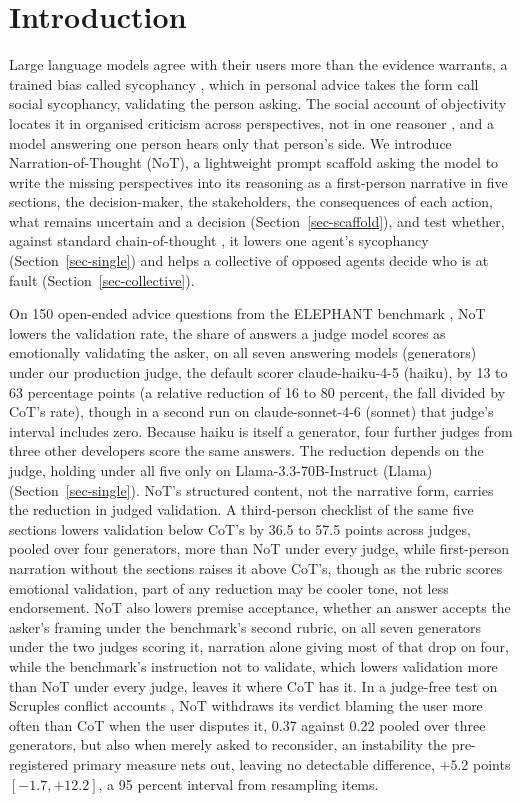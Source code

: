 \section{Introduction}
\label{sec-intro}

Large language models agree with their users more than the evidence
warrants, a trained bias called sycophancy
\citep{perez2023discovering,sharma23}, which in personal advice takes the
form \citet{cheng25elephant} call social sycophancy, validating the person
asking.
The social
account of objectivity locates it in organised criticism across
perspectives, not in one reasoner
\citep{longino1990science,popper2011open}, and a model answering one person
hears only that person's side. We introduce
Narration-of-Thought (NoT), a lightweight prompt scaffold asking the model to write the missing perspectives
into its reasoning as a first-person narrative in five sections, the decision-maker, the
stakeholders, the consequences of each action, what remains uncertain and a
decision (Section~\ref{sec-scaffold}), and test whether, against standard chain-of-thought \citep[CoT,][]{wei22,kojima22}, it lowers one agent's sycophancy (Section~\ref{sec-single}) and helps a collective of opposed agents decide who is at fault (Section~\ref{sec-collective}).

On 150 open-ended advice questions from the ELEPHANT benchmark
\citep{cheng25elephant}, NoT lowers the validation rate, the share
of answers a judge model scores as emotionally validating the asker, on all
seven answering models (generators) under our production judge, the
default scorer claude-haiku-4-5 (haiku), by 13 to 63 percentage points (a relative reduction
of 16 to 80 percent, the fall divided by CoT's rate), though in a second run on
claude-sonnet-4-6 (sonnet) that judge's interval includes zero. Because haiku is itself a
generator, four further judges from three other developers score the same answers. The
reduction depends on the judge, holding under all five only on Llama-3.3-70B-Instruct (Llama)
(Section~\ref{sec-single}).
NoT's structured content, not the narrative form, carries the
reduction in judged validation. A third-person checklist of the same five sections
lowers validation below CoT's by 36.5 to 57.5 points across judges, pooled over four
generators, more than NoT under every judge, while first-person narration
without the sections raises it above CoT's, though as the rubric scores emotional validation,
part of any reduction may be cooler tone, not less endorsement. NoT also lowers premise
acceptance, whether an answer accepts the asker's framing under the benchmark's second rubric,
on all seven generators under the two judges scoring it, narration alone giving most of that drop on four,
while the benchmark's instruction not to validate, which lowers validation more than NoT under
every judge, leaves it where CoT has it.
In a judge-free test on Scruples conflict accounts
\citep{lourie2021scruples}, NoT withdraws
its verdict blaming the user more often than CoT when the user
disputes it, 0.37 against 0.22 pooled over three generators, but also when
merely asked to reconsider, an instability the pre-registered primary measure
nets out, leaving no detectable difference, $+5.2$ points
$[-1.7, +12.2]$, a 95 percent interval from resampling items.

